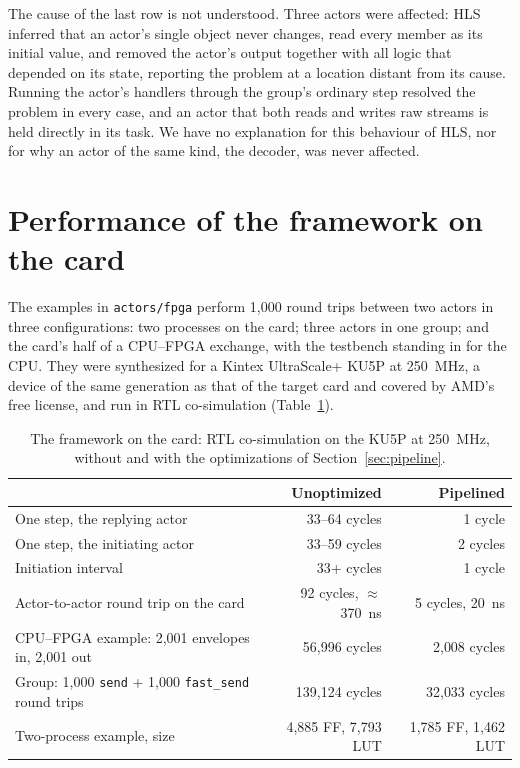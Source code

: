\documentclass[11pt]{article}
\newcommand{\fs}{\texttt{fast\_send}}
\newcommand{\snd}{\texttt{send}}
\begin{document}
The cause of the last row is not understood. Three actors were affected: HLS
inferred that an actor's single object never changes, read every member as its
initial value, and removed the actor's output together with all logic that
depended on its state, reporting the problem at a location distant from its
cause. Running the actor's handlers through the group's ordinary step resolved
the problem in every case, and an actor that both reads and writes raw streams
is held directly in its task. We have no explanation for this behaviour of HLS,
nor for why an actor of the same kind, the decoder, was never affected.

\section{Performance of the framework on the card}
\label{sec:perf}

The examples in \texttt{actors/fpga} perform 1{,}000 round trips between two
actors in three configurations: two processes on the card; three actors in one
group; and the card's half of a CPU--FPGA exchange, with the testbench standing
in for the CPU. They were synthesized for a Kintex UltraScale+ KU5P at 250~MHz,
a device of the same generation as that of the target card and covered by AMD's
free license, and run in RTL co-simulation (Table~\ref{tab:perf}).

\begin{table}[h]
\centering
\caption{The framework on the card: RTL co-simulation on the KU5P at
250~MHz, without and with the optimizations of Section~\ref{sec:pipeline}.}
\label{tab:perf}
\small
\begin{tabular}{p{6.6cm} r r}
\toprule
& Unoptimized & Pipelined \\
\midrule
One step, the replying actor & 33--64 cycles & 1 cycle \\
One step, the initiating actor & 33--59 cycles & 2 cycles \\
Initiation interval & 33+ cycles & 1 cycle \\
Actor-to-actor round trip on the card & 92 cycles, $\approx$370~ns & 5 cycles, 20~ns \\
CPU--FPGA example: 2{,}001 envelopes in, 2{,}001 out & 56{,}996 cycles & 2{,}008 cycles \\
Group: 1{,}000 \snd{} + 1{,}000 \fs{} round trips & 139{,}124 cycles & 32{,}033 cycles \\
Two-process example, size & 4{,}885 FF, 7{,}793 LUT & 1{,}785 FF, 1{,}462 LUT \\
\bottomrule
\end{tabular}
\end{table}
\end{document}
